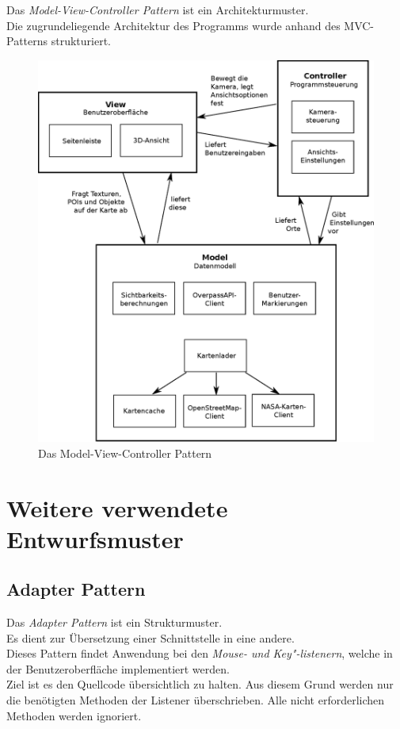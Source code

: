 \documentclass[10pt]{scrreprt}
\begin{document}
Das \textit{Model-View-Controller Pattern} ist ein Architekturmuster.\\ Die zugrundeliegende Architektur des Programms wurde anhand des MVC-Patterns strukturiert.\\
\begin{figure}[ht]
\begin{centering}
\includegraphics[scale=0.5]{ModelViewController.eps}
\caption{Das Model-View-Controller Pattern}
\end{centering}
\end{figure}


\section{Weitere verwendete Entwurfsmuster}

\subsection{Adapter Pattern}
Das \textit{Adapter Pattern} ist ein Strukturmuster. \\
Es dient zur Übersetzung einer Schnittstelle in eine andere. \\ Dieses Pattern findet Anwendung bei den \textit{Mouse- und Key"-listenern}, welche in der Benutzeroberfläche implementiert werden. \\ Ziel ist es den Quellcode übersichtlich zu halten. Aus diesem Grund werden nur die benötigten Methoden der Listener überschrieben. Alle nicht erforderlichen Methoden werden ignoriert.
\end{document}
